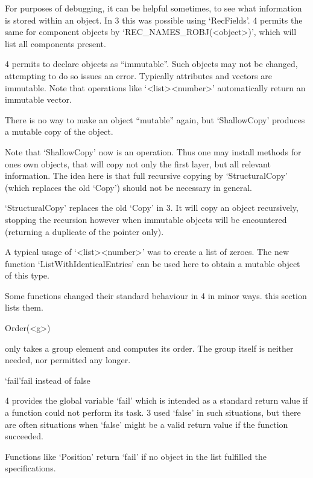 For purposes of debugging, it can be helpful sometimes, to see what
information is stored within an object. In {\GAP}3 this was possible using
`RecFields'. {\GAP}4 permits the same for component objects by
`REC_NAMES_ROBJ(<object>)', which will list all components present.


{\GAP}4 permits to declare objects as ``immutable''. Such objects may not
be changed, attempting to do so issues an error. Typically attributes and
vectors are immutable. Note that operations like `<list>\*<number>'
automatically return an immutable vector.

There is no way to make an object ``mutable'' again, but `ShallowCopy'
produces a mutable copy of the object.

Note that `ShallowCopy' now is an operation. Thus one may install methods
for ones own objects,
that will copy not only the first layer, but all relevant information.
The idea here is that full recursive copying by `StructuralCopy' (which
replaces the old `Copy') should not be necessary in general.

`StructuralCopy' replaces the old `Copy' in {\GAP}3. It will copy an object
recursively, stopping the recursion however when immutable objects will be
encountered (returning a duplicate of the pointer only).

A typical usage of `<list>\*<number>' was to create a list of zeroes. The
new function `ListWithIdenticalEntries' can be used here to obtain a mutable
object of this type.


Some functions changed their standard behaviour in {\GAP}4 in minor ways.
this section lists them.

\>Order(<g>)

only takes a group element and computes its order. The group itself is
neither needed, nor permitted any longer.

\>`fail'{fail instead of false}

{\GAP}4 provides the global variable `fail' which is intended as a standard
return value if a function could not perform its task. {\GAP}3 used `false'
in such situations, but there are often situations when `false' might be a
valid return value if the function succeeded.

Functions like `Position' return `fail' if no object in the list fulfilled
the specifications.


